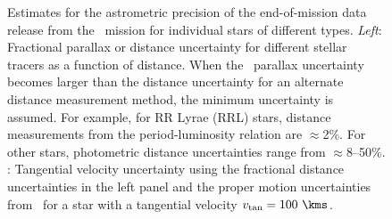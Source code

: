 \begin{figure}[h]
\centering
\caption{Estimates for the astrometric precision of the end-of-mission data
release from the \gaia\ mission for individual stars of different types.
\textit{Left}: Fractional parallax or distance uncertainty for different stellar
tracers as a function of distance. When the \gaia\ parallax uncertainty becomes
larger than the distance uncertainty for an alternate distance measurement
method, the minimum uncertainty is assumed. For example, for RR Lyrae (RRL)
stars, distance measurements from the period-luminosity relation are
$\approx$2\%. For other stars, photometric distance uncertainties range from
$\approx$8--50\%. : Tangential velocity uncertainty using the
fractional distance uncertainties in the left panel and the proper motion
uncertainties from \gaia\ for a star with a tangential velocity $v_{\rm tan} =
100~\kms$.}
\label{fig:gaiastellarpops}
\end{figure}